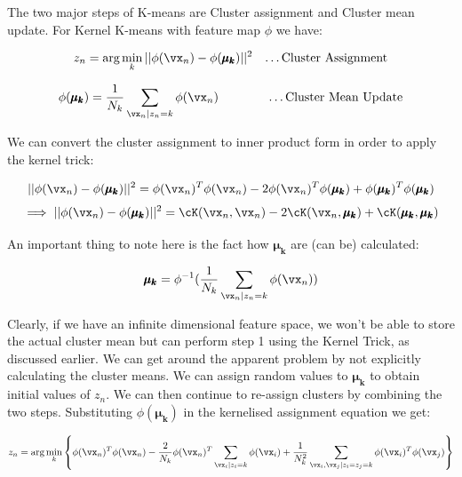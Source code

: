 \documentclass[a4paper,11pt]{article}
\begin{document}
\begin{mlsolution}

The two major steps of K-means are Cluster assignment and Cluster mean update. For Kernel K-means with feature map $\phi$ we have:

\begin{equation*}
    z_n = \text{arg}\min\limits_k ||\phi(\vx_n) - \phi(\pmb{\mu_k})||^2 \;\;\; \dots \text{Cluster Assignment}
\end{equation*}

\begin{equation*}
    \phi(\pmb{\mu_k}) = \frac{1}{N_k} \sum\limits_{\vx_n | z_n=k}\phi(\vx_n) \;\;\;\;\;\;\;\;\;\;\;\;\;\; \dots \text{Cluster Mean Update}
\end{equation*}

We can convert the cluster assignment to inner product form in order to apply the kernel trick:

\begin{equation*}      
    ||\phi(\vx_n) - \phi(\pmb{\mu_k})||^2= \phi(\vx_n)^T\phi(\vx_n) - 2\phi(\vx_n)^T\phi(\pmb{\mu_k}) + \phi(\pmb{\mu_k})^T\phi(\pmb{\mu_k})
\end{equation*}
\begin{equation*}
    \implies||\phi(\vx_n) - \phi(\pmb{\mu_k})||^2=\cK(\vx_n, \vx_n) -2\cK(\vx_n, \pmb{\mu_k}) + \cK(\pmb{\mu_k},\pmb{\mu_k})
\end{equation*}

An important thing to note here is the fact how $\pmb{\mu_k}$ are (can be) calculated:

\begin{equation*}
    \pmb{\mu_k} = \phi^{-1} (\frac{1}{N_k} \sum\limits_{\vx_n | z_n=k}\phi(\vx_n))
\end{equation*}

Clearly, if we have an infinite dimensional feature space, we won't be able to store the actual cluster mean but can perform step 1 using the Kernel Trick, as discussed earlier.
We can get around the apparent problem by not explicitly calculating the cluster means. We can assign random values to $\pmb{\mu_k}$ to obtain initial values of $z_n$.
We can then continue to re-assign clusters by combining the two steps. Substituting $\phi(\pmb{\mu_k})$ in the kernelised assignment equation we get:

\begin{equation*}
    z_n = \text{arg}\min\limits_k \bc{\phi(\vx_n)^T\phi(\vx_n) - \frac{2}{N_k}\phi(\vx_n)^T\sum\limits_{\vx_i | z_i=k}\phi(\vx_i) + \frac{1}{N_k^2}\sum\limits_{\vx_i, \vx_j | z_i=z_j=k}\phi(\vx_i)^T\phi(\vx_j)}
\end{equation*}


\end{mlsolution}
\end{document}

